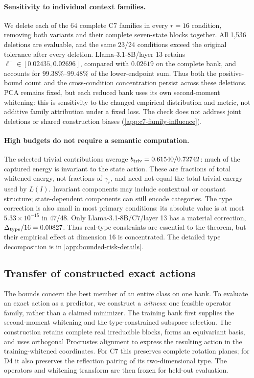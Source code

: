 \paragraph{Sensitivity to individual context families.}
We delete each of the 64 complete C7 families in every $r=16$ condition, removing both variants and their complete seven-state blocks together. All 1,536 deletions are evaluable, and the same 23/24 conditions exceed the original tolerance after every deletion. Llama-3.1-8B/layer 13 retains $\ell^-\in[0.02435,0.02696]$, compared with $0.02619$ on the complete bank, and accounts for $99.38\%$--$99.48\%$ of the lower-endpoint sum. Thus both the positive-bound count and the cross-condition concentration persist across these deletions. PCA remains fixed, but each reduced bank uses its own second-moment whitening: this is sensitivity to the changed empirical distribution and metric, not additive family attribution under a fixed loss. The check does not address joint deletions or shared construction biases (\cref{app:c7-family-influence}).

\paragraph{High budgets do not require a semantic computation.}
The selected trivial contributions average $b_{\rm triv}=0.61540/0.72742$: much of the captured energy is invariant to the state action. These are fractions of total whitened energy, not fractions of $\gamma_r$, and need not equal the total trivial energy used by $L(I)$. Invariant components may include contextual or constant structure; state-dependent components can still encode categories. The type correction is also small in most primary conditions: its absolute value is at most $5.33\times10^{-15}$ in 47/48. Only Llama-3.1-8B/C7/layer 13 has a material correction, $\Delta_{\rm type}/16=0.00827$. Thus real-type constraints are essential to the theorem, but their empirical effect at dimension 16 is concentrated. The detailed type decomposition is in \cref{app:bounded-risk-details}.

\subsection{Transfer of constructed exact actions}
\label{sec:witness-transfer}

The bounds concern the best member of an entire class on one bank. To evaluate an exact action as a predictor, we construct a \emph{witness}: one feasible operator family, rather than a claimed minimizer. The training bank first supplies the second-moment whitening and the type-constrained subspace selection. The construction retains complete real irreducible blocks, forms an equivariant basis, and uses orthogonal Procrustes alignment to express the resulting action in the training-whitened coordinates. For C7 this preserves complete rotation planes; for D4 it also preserves the reflection pairing of its two-dimensional type. The operators and whitening transform are then frozen for held-out evaluation.

